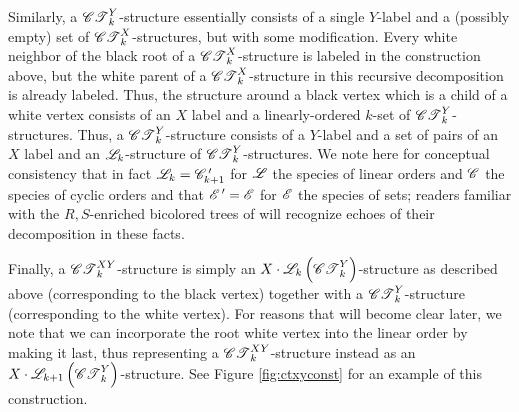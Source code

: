 \documentclass[distribution,draft]{brandiss} %
\numberwithin{section}{chapter}
\numberwithin{figure}{chapter}
\begin{document}
Similarly, a $\mathscr{CT}_{k}^{Y}$-structure essentially consists of a single $Y$-label and a (possibly empty) set of $\mathscr{CT}_{k}^{X}$-structures, but with some modification.
Every white neighbor of the black root of a $\mathscr{CT}_{k}^{X}$-structure is labeled in the construction above, but the white parent of a $\mathscr{CT}_{k}^{X}$-structure in this recursive decomposition is already labeled.
Thus, the structure around a black vertex which is a child of a white vertex consists of an $X$ label and a linearly-ordered $k$-set of $\mathscr{CT}_{k}^{Y}$-structures.
Thus, a $\mathscr{CT}_{k}^{Y}$-structure consists of a $Y$-label and a set of pairs of an $X$ label and an $\mathscr{L}_{k}$-structure of $\mathscr{CT}_{k}^{Y}$-structures.
We note here for conceptual consistency that in fact $\mathscr{L}_{k} =  {\mathscr{C}}^{\,\prime } _{k+1}$ for $\mathscr{L}$ the species of linear orders and $\mathscr{C}$ the species of cyclic orders and that $ {\mathscr{E}}^{\,\prime }  = \mathscr{E}$ for $\mathscr{E}$ the species of sets; readers familiar with the $R, S$-enriched bicolored trees of \cite[\S 3.2]{bll:species} will recognize echoes of their decomposition in these facts.

Finally, a $\mathscr{CT}_{k}^{XY}$-structure is simply an $X \cdot \mathscr{L}_{k} \left( {\mathscr{CT}_{k}^{Y}} \right)$-structure as described above (corresponding to the black vertex) together with a $\mathscr{CT}_{k}^{Y}$-structure (corresponding to the white vertex).
For reasons that will become clear later, we note that we can incorporate the root white vertex into the linear order by making it last, thus representing a $\mathscr{CT}_{k}^{XY}$-structure instead as an $X \cdot \mathscr{L}_{k+1} \left( {\mathscr{CT}_{k}^{Y}} \right)$-structure.
See Figure \ref{fig:ctxyconst} for an example of this construction.
\end{document}
